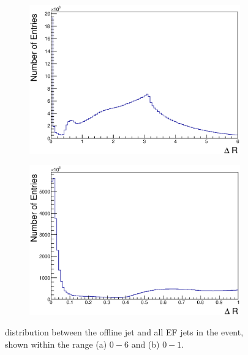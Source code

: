 \begin{figure}
\centering
        \begin{subfigure}[b]{0.5\textwidth}
                \centering
                \includegraphics[width=\textwidth]{figures/ServiceWork/Jets/EF_DRUnmatchedJetsJet.eps}
        \end{subfigure}%
        \begin{subfigure}[b]{0.5\textwidth}
                \centering
                \includegraphics[width=\textwidth]{figures/ServiceWork/Jets/EF_DRUnmatchedJetsZoomedJet.eps}
        \end{subfigure}%
\caption[\dr{} between offline and EF jets]{
\dr{} distribution between the offline jet and all EF jets in the event, shown within the range (a) $0 - 6$ and (b) $0 - 1$.
\label{SW_jet_EF_dR}}
\end{figure}



